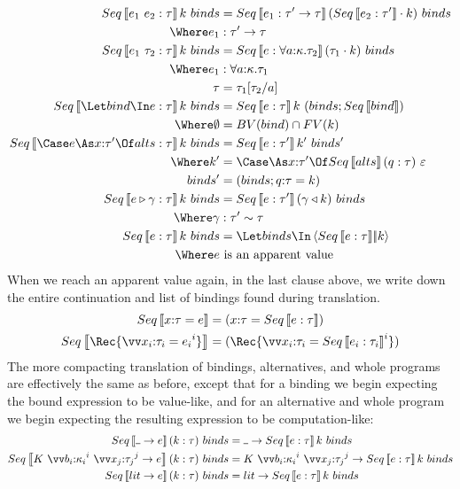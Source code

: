 \documentclass{article}
\begin{document}
\begin{align*}
  Seq\trans{\expr_1 ~ \expr_2 : \ty} \ko ~ \binds
  &=
  Seq\trans{\expr_1 : \ty' \to \ty} (\app{Seq\trans{\expr_2 : \ty'}}{\ko}) ~ \binds
  \\
  \Where
    \expr_1 &: \ty' \to \ty
  \\
  Seq\trans{\expr_1 ~ \ty_2 : \ty} \ko ~ \binds
  &=
  Seq\trans{\expr : \forall \ann a \ki. \ty_2} (\app{\ty_1}{\ko}) ~ \binds
  \\
  \Where
    \expr_1 &: \forall \ann a \ki. \ty_1
  \\
    \ty &= \ty_1[\ty_2/a]
  \\
  Seq\trans{\Let \abind \In \expr : \ty} \ko ~ \binds
  &=
  Seq\trans{\expr : \ty} \ko ~ (\binds; Seq\trans{\abind})
  \\
  \Where
  \emptyset &= BV(\abind) \cap FV(\ko)
  \\
  Seq\trans{\Case \expr \As \ann{x}{\ty'} \Of \alts : \ty} \ko ~ \binds
  &=
  Seq\trans{\expr : \ty'} \ko' ~ \binds'
  \\
  \Where
  \ko' &= \caseas{\ann{x}{\ty'}}{Seq\trans{\alts} (q:\ty) ~ \mt}
  \\
  \binds' &= (\binds; \ann{q}{\ty} = \ko)
  \\
  Seq\trans{\coerce{\expr}{\cn} : \ty} \ko ~ \binds
  &=
  Seq\trans{\expr : \ty'} (\koerce{\cn}{\ko}) ~ \binds
  \\
  \Where
  \cn &: \eqty{\ty'}{\ty}
  \\
  Seq\trans{\expr : \ty} \ko ~ \binds
  &=
  \Let \binds \In \cut{Seq\trans{\expr : \ty}}{\ko}
  \\
  \Where
  \expr & \text{ is an apparent value }
\end{align*}
When we reach an apparent value again, in the last clause above, we write down
the entire continuation and list of bindings found during translation.
\begin{align*}
  Seq\trans{\ann x \ty = \expr}
  &=
  (\ann x \ty = Seq\trans{\expr : \ty})
  \\
  Seq\trans{\Rec \{ \vect[i]{\ann{x_i}{\ty_i} = \expr_i} \}}
  &=
  (\Rec \{ \vect[i]{\ann{x_i}{\ty_i} = Seq\trans{\expr_i : \ty_i}} \})
\end{align*}
The more compacting translation of bindings, alternatives, and whole programs
are effectively the same as before, except that for a binding we begin expecting
the bound expression to be value-like, and for an alternative and whole program
we begin expecting the resulting expression to be computation-like:
\begin{align*}
  Seq\trans{\blank \to \expr} (\ko:\ty) ~ \binds
  &=
  \blank \to Seq\trans{\expr : \ty} \ko ~ \binds
  \\
  Seq\trans{
    K ~ \vect[i]{\ann{b_i}{\ki_i}} ~ \vect[j]{\ann{x_j}{\ty_j}} \to \expr
  } (\ko:\ty) ~ \binds
  &=
  K ~ \vect[i]{\ann{b_i}{\ki_i}} ~ \vect[j]{\ann{x_j}{\ty_j}}
  \to
  Seq\trans{\expr : \ty} \ko ~ \binds
  \\
  Seq\trans{\lit \to \expr} (\ko:\ty) ~ \binds
  &=
  \lit \to Seq\trans{\expr : \ty} \ko ~ \binds
\end{align*}
\end{document}
